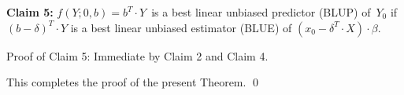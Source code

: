 

\vskip 0.5cm
\noindent
\textbf{Claim 5:}\quad
$f(Y;0,b) = b^{T}\cdot Y$\, is a best linear unbiased predictor (BLUP) of \,$Y_{0}$ if
$(b-\delta)^{T} \cdot Y$ is a best linear unbiased estimator (BLUE) of
$(x_{0} - \delta^{T}\cdot X) \cdot \beta$.

\vskip 0.2cm
\noindent
Proof of Claim 5: \quad Immediate by Claim 2 and Claim 4.

\vskip 0.5cm
\noindent
This completes the proof of the present Theorem.
\qed


\renewcommand{\theenumi}{\roman{enumi}}
\renewcommand{\labelenumi}{\textnormal{(\theenumi)}$\;\;$}

